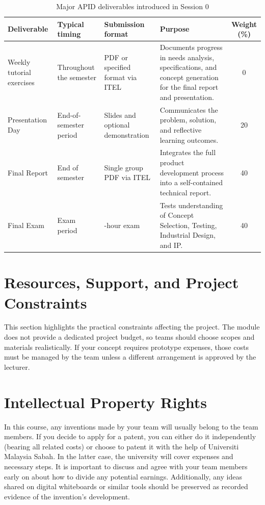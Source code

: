 \begin{table}[htbp]
\centering
\caption{Major APID deliverables introduced in Session 0}
\label{tab:session0-deliverables}
\renewcommand{\arraystretch}{1.2}
\begin{tabularx}{\textwidth}{|>{\raggedright\arraybackslash}p{}|>{\raggedright\arraybackslash}p{}|>{\raggedright\arraybackslash}p{}|X|c|}
\hline
\textbf{Deliverable} & \textbf{Typical timing} & \textbf{Submission format} & \textbf{Purpose} & \textbf{Weight (\%)}\\
\hline
Weekly tutorial exercises & Throughout the semester & PDF or specified format via ITEL & Documents progress in needs analysis, specifications, and concept generation for the final report and presentation. & 0 \\
\hline
Presentation Day & End-of-semester period & Slides and optional demonstration & Communicates the problem, solution, and reflective learning outcomes. & 20 \\
\hline
Final Report & End of semester & Single group PDF via ITEL & Integrates the full product development process into a self-contained technical report. & 40 \\
\hline
Final Exam & Exam period & 3-hour exam & Tests understanding of Concept Selection, Testing, Industrial Design, and IP. & 40 \\
\hline
\end{tabularx}
\end{table}

\section{Resources, Support, and Project Constraints}

This section highlights the practical constraints affecting the project. The module does not provide a dedicated project budget, so teams should choose scopes and materials realistically. If your concept requires prototype expenses, those costs must be managed by the team unless a different arrangement is approved by the lecturer.

\section*{Intellectual Property Rights}

In this course, any inventions made by your team will usually belong to the team members. If you decide to apply for a patent, you can either do it independently (bearing all related costs) or choose to patent it with the help of Universiti Malaysia Sabah. In the latter case, the university will cover expenses and necessary steps. It is important to discuss and agree with your team members early on about how to divide any potential earnings. Additionally, any ideas shared on digital whiteboards or similar tools should be preserved as recorded evidence of the invention's development.
